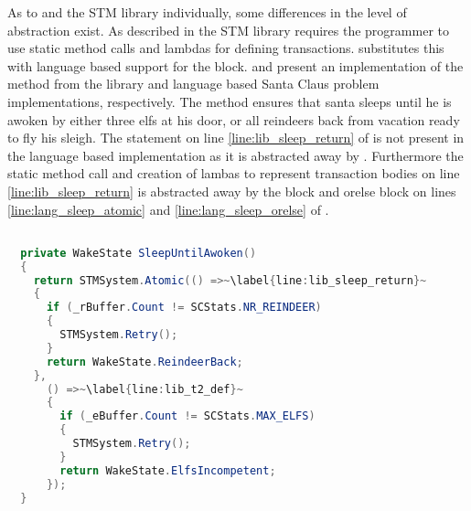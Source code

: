 As to \stmname and the \ac{STM} library individually, some differences in the level of abstraction exist. As described in  the \ac{STM} library requires the programmer to use static method calls and lambdas for defining transactions. \stmname substitutes this with language based support for the  block.  and  present an implementation of the  method from the library and language based Santa Claus problem implementations, respectively. The method ensures that santa sleeps until he is awoken by either three elfs at his door, or all reindeers back from vacation ready to fly his sleigh. The  statement on line \ref{line:lib_sleep_return} of  is not present in the language based implementation as it is abstracted away by \stmnamesp. Furthermore the static method call and creation of lambas to represent transaction bodies on line \ref{line:lib_sleep_return} is abstracted away by the  block and orelse block on lines \ref{line:lang_sleep_atomic} and \ref{line:lang_sleep_orelse} of .

\begin{lstlisting}[float,label=lst:lib_SleepUntilAwoken,
  caption={\bscode{SleepUntilAwoken} Method - \ac{STM} Library},
  language=Java,  
  showspaces=false,
  showtabs=false,
  breaklines=true,
  showstringspaces=false,
  breakatwhitespace=true,
  escapechar=~,
  commentstyle=\color{greencomments},
  keywordstyle=\color{bluekeywords},
  stringstyle=\color{redstrings},
  morekeywords={atomic, retry, orelse, var, get, set, ref, out}]  % Start your code-block

  private WakeState SleepUntilAwoken()
  {
    return STMSystem.Atomic(() =>~\label{line:lib_sleep_return}~
    {
      if (_rBuffer.Count != SCStats.NR_REINDEER)
      {
        STMSystem.Retry();
      }
      return WakeState.ReindeerBack;
    },
      () =>~\label{line:lib_t2_def}~
      {
        if (_eBuffer.Count != SCStats.MAX_ELFS)
        {
          STMSystem.Retry();
        }
        return WakeState.ElfsIncompetent;
      });
  }
\end{lstlisting}

